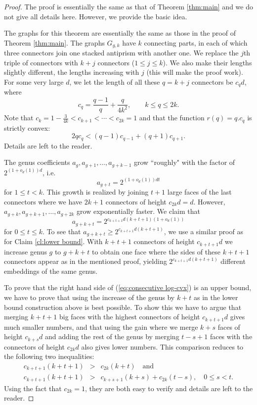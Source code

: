 \documentclass[11pt]{article}
\begin{document}
\begin{proof}
  The proof is essentially the same as that of Theorem \ref{thm:main} and we do not give all details here. However, we provide the basic idea.

  The graphs for this theorem are essentially the same as those in the proof of Theorem \ref{thm:main}. The graphs $G_{g,k}$ have $k$ connecting parts, in each of which three connectors join one stacked antiprism with another one. We replace the $j$th triple of connectors with $k+j$ connectors ($1\le j\le k$). We also make their lengths slightly different, the lengths increasing with $j$ (this will make the proof work). For some very large $d$, we let the length of all these $q=k+j$ connectors be $c_qd$, where
  $$
      c_q = \frac{q-1}{q} + \frac{q}{4k^2}, \qquad k\le q\le 2k.
  $$
  Note that $c_k = 1-\tfrac{3}{4k} < c_{k+1} < \cdots < c_{2k} = 1$ and that the function $r(q) = q.c_q$ is strictly convex:
  \begin{equation}\label{eq:qc_q is convex}
    2qc_q < (q-1)c_{q-1} + (q+1)c_{q+1}.
  \end{equation}
  Details are left to the reader.

  The genus coefficients $a_g,a_{g+1},\dots, a_{g+k-1}$ grow ``roughly" with the factor of $2^{(1+o_d(1))d}$, i.e.
  $$
      a_{g+t} = 2^{(1+o_d(1))dt}
  $$
  for $1 \le t < k$. This growth is realized by joining $t+1$ large faces of the last connectors where we have $2k+1$ connectors of height $c_{2k}d=d$.
  However, $a_{g+k},a_{g+k+1},\dots, a_{g+2k}$ grow exponentially faster. We claim that
  \begin{equation}\label{eq:consecutive log-cvx}
      a_{g+k+t} = 2^{c_{k+t+1}d(k+t+1)(1+o_d(1))}
  \end{equation}
  for $0 \le t \le k$. To see that $a_{g+k+t} \ge 2^{c_{k+t+1}d(k+t+1)}$, we use a similar proof as for Claim \ref{cl:lower bound}. With $k+t+1$ connectors of height $c_{k+t+1}d$ we increase genus $g$ to $g+k+t$ to obtain one face where the sides of these $k+t+1$ connectors appear as in the mentioned proof, yielding $2^{c_{k+t+1}d(k+t+1)}$ different embeddings of the same genus.

  To prove that the right hand side of (\ref{eq:consecutive log-cvx}) is an upper bound, we have to prove that using the increase of the genus by $k+t$ as in the lower bound construction above is best possible. To show this we have to argue that merging $k+t+1$ big faces with the highest connectors of height $c_{k+t+1}d$ gives much smaller numbers, and that using the gain where we merge $k+s$ faces of height $c_{k+s}d$ and adding the rest of the genus by merging $t-s+1$ faces with the connectors of height $c_{2k}d$ also gives lower numbers. This comparison reduces to the following two inequalities:
  \begin{eqnarray*}
    c_{k+t+1}(k+t+1) &>& c_{2k}(k+t)\quad \mathrm{and} \\
    c_{k+t+1}(k+t+1) &>& c_{k+s+1}(k+s) + c_{2k}(t-s), \quad 0\le s < t.
  \end{eqnarray*}
  Using the fact that $c_{2k}=1$, they are both easy to verify and details are left to the reader.


\end{proof}
\end{document}
